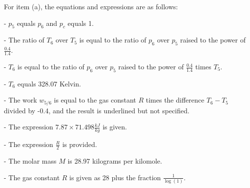 For item (a), the equations and expressions are as follows:

- \( p_5 \) equals \( p_6 \) and \( p_c \) equals 1.

- The ratio of \( T_6 \) over \( T_5 \) is equal to the ratio of \( p_6 \) over \( p_5 \) raised to the power of \( \frac{0.4}{1.4} \).

- \( T_6 \) is equal to the ratio of \( p_6 \) over \( p_5 \) raised to the power of \( \frac{0.4}{1.4} \) times \( T_5 \).

- \( T_6 \) equals 328.07 Kelvin.

- The work \( w_{5/6} \) is equal to the gas constant \( R \) times the difference \( T_6 - T_5 \) divided by -0.4, and the result is underlined but not specified.

- The expression \( 7.87 \times 71.498 \frac{kJ}{kg} \) is given.

- The expression \( \frac{R}{2} \) is provided.

- The molar mass \( M \) is 28.97 kilograms per kilomole.

- The gas constant \( R \) is given as 28 plus the fraction \( \frac{1}{\log(1)} \).
